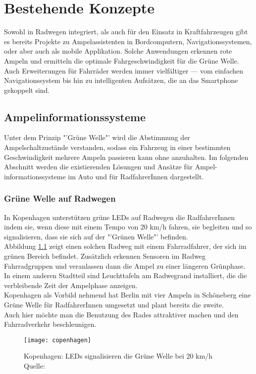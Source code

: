 \chapter{\label{chap:state}Bestehende Konzepte}
Sowohl in Radwegen integriert, als auch für den Einsatz in Kraftfahrzeugen gibt es bereits Projekte zu Ampelassistenten in Bordcomputern, Navigationssystemen, oder aber auch als mobile Applikation. Solche Anwendungen erkennen rote Ampeln und ermitteln die optimale Fahrgeschwindigkeit für die Grüne Welle. Auch Erweiterungen für Fahrräder werden immer vielfältiger --- vom einfachen Navigationssystem bis hin zu intelligenten Aufsätzen, die an das \gls{Smartphone} gekoppelt sind.
\section{Ampelinformationssysteme}
Unter dem Prinzip "'Grüne Welle"' wird die Abstimmung der Ampelschaltzustände verstanden, sodass ein Fahrzeug in einer bestimmten Geschwindigkeit mehrere Ampeln passieren kann ohne anzuhalten. Im folgenden Abschnitt werden die existierenden Lösungen und Ansätze für Ampel- informationssysteme im Auto und für RadfahrerInnen dargestellt.
\subsection{Grüne Welle auf Radwegen}
In Kopenhagen unterstützen grüne \glspl{LED} auf Radwegen die RadfahrerInnen indem sie, wenn diese mit einem Tempo von 20 km/h fahren, sie begleiten und so signalisieren, dass sie sich auf der "'Grünen Welle"' befinden.\\
Abbildung \ref{fig:copenhagen} zeigt einen solchen Radweg mit einem Fahrradfahrer, der sich im grünen Bereich befindet. Zusätzlich erkennen Sensoren im Radweg Fahrradgruppen und veranlassen dann die Ampel zu einer längeren Grünphase. In einem anderen Stadtteil sind Leuchttafeln am Radwegrand installiert, die die verbleibende Zeit der Ampelphase anzeigen. \cite{KopIng}\\
Kopenhagen als Vorbild nehmend hat Berlin mit vier Ampeln in Schöneberg eine Grüne Welle für RadfahrerInnen umgesetzt und plant bereits die zweite. \cite{BZ}\\ 
Auch hier möchte man die Benutzung des Rades attraktiver machen und den Fahrradverkehr beschleunigen.
\begin{figure}[H]  
    \centering  
    \texttt{[image: copenhagen]} 
    \grayRule
    \caption[Grüne Welle durch \glspl{LED}]{Kopenhagen: \glspl{LED} signalisieren die Grüne Welle bei 20 km/h  Quelle: \cite{NYT}}
     \label{fig:copenhagen}
\end{figure}
